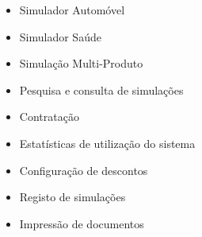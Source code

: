 \begin{itemize}
\item Simulador Automóvel
\item Simulador Saúde
\item Simulação Multi-Produto
\item Pesquisa e consulta de simulações
\item Contratação
\item Estatísticas de utilização do sistema
\item Configuração de descontos
\item Registo de simulações
\item Impressão de documentos
\end{itemize}